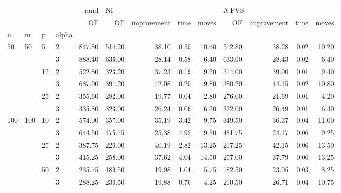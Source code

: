 \begin{tabular}{llllrrrrrrrrr}
\toprule
    &     &     &   &   rand & \multicolumn{4}{l}{NI} & \multicolumn{4}{l}{A-FVS} \\
    &     &     &   &     OF &     OF & improvement &   time & moves &     OF & improvement & time & moves \\
n & m & p & alpha &        &        &             &        &       &        &             &      &       \\
\midrule
\multirow{6}{*}{50} & \multirow{6}{*}{50} & \multirow{2}{*}{5} & 2 & 847.80 & 514.20 &       38.10 &   0.50 & 10.60 & 512.80 &       38.28 & 0.02 & 10.20 \\
    &     &     & 3 & 888.40 & 636.00 &       28.14 &   0.58 &  6.40 & 633.60 &       28.43 & 0.02 &  6.40 \\
\cline{3-13}
    &     & \multirow{2}{*}{12} & 2 & 522.80 & 323.20 &       37.23 &   0.19 &  9.20 & 314.00 &       39.00 & 0.01 &  9.40 \\
    &     &     & 3 & 687.00 & 397.20 &       42.08 &   0.20 &  9.80 & 380.20 &       44.15 & 0.02 & 10.80 \\
\cline{3-13}
    &     & \multirow{2}{*}{25} & 2 & 355.60 & 282.00 &       19.77 &   0.04 &  2.80 & 276.00 &       21.69 & 0.01 &  4.20 \\
    &     &     & 3 & 435.80 & 323.00 &       26.24 &   0.06 &  6.20 & 322.00 &       26.49 & 0.01 &  6.40 \\
\cline{1-13}
\cline{2-13}
\cline{3-13}
\multirow{6}{*}{100} & \multirow{6}{*}{100} & \multirow{2}{*}{10} & 2 & 574.00 & 357.00 &       35.19 &   3.42 &  9.75 & 349.50 &       36.37 & 0.04 & 11.00 \\
    &     &     & 3 & 644.50 & 475.75 &       25.38 &   4.98 &  9.50 & 481.75 &       24.17 & 0.06 &  9.25 \\
\cline{3-13}
    &     & \multirow{2}{*}{25} & 2 & 387.75 & 220.00 &       40.19 &   2.82 & 13.25 & 217.25 &       42.15 & 0.06 & 13.50 \\
    &     &     & 3 & 415.25 & 258.00 &       37.62 &   4.04 & 14.50 & 257.00 &       37.79 & 0.06 & 13.25 \\
\cline{3-13}
    &     & \multirow{2}{*}{50} & 2 & 235.75 & 189.50 &       19.98 &   1.04 &  5.75 & 182.50 &       23.05 & 0.03 &  8.25 \\
    &     &     & 3 & 288.25 & 230.50 &       19.88 &   0.76 &  4.25 & 210.50 &       26.71 & 0.04 & 10.75 \\
\cline{1-13}
\cline{2-13}
\cline{3-13}

\end{tabular}
